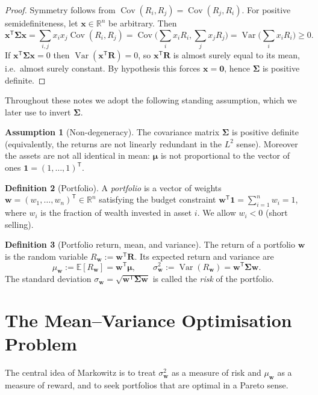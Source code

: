 \documentclass[11pt]{article}
\theoremstyle{definition}
\newtheorem{definition}{Definition}[section]
\newtheorem{assumption}[definition]{Assumption}
\theoremstyle{plain}
\newcommand{\R}{\mathbb{R}}
\newcommand{\E}{\mathbb{E}}
\newcommand{\Var}{\operatorname{Var}}
\newcommand{\Cov}{\operatorname{Cov}}
\newcommand{\one}{\mathbf{1}}
\newcommand{\bw}{\bm{w}}
\newcommand{\bmu}{\bm{\mu}}
\newcommand{\bSigma}{\bm{\Sigma}}
\newcommand{\bzero}{\bm{0}}
\newcommand{\T}{^{\mathsf{T}}}
\begin{document}
\begin{proof}
Symmetry follows from $\Cov(R_i,R_j) = \Cov(R_j,R_i)$. For positive
semidefiniteness, let $\bm{x} \in \R^n$ be arbitrary. Then
\[
\bm{x}\T \bSigma \bm{x}
= \sum_{i,j} x_i x_j \Cov(R_i,R_j)
= \Cov\!\Big(\sum_i x_i R_i, \sum_j x_j R_j\Big)
= \Var\!\Big(\sum_i x_i R_i\Big) \ge 0 .
\]
If $\bm{x}\T \bSigma \bm{x} = 0$ then $\Var(\bm{x}\T \bm{R}) = 0$, so
$\bm{x}\T \bm{R}$ is almost surely equal to its mean, i.e.\ almost surely
constant. By hypothesis this forces $\bm{x} = \bzero$, hence $\bSigma$ is
positive definite.
\end{proof}

Throughout these notes we adopt the following standing assumption, which we
later use to invert $\bSigma$.

\begin{assumption}[Non-degeneracy]\label{ass:nondeg}
The covariance matrix $\bSigma$ is positive definite (equivalently, the
returns are not linearly redundant in the $L^2$ sense). Moreover the assets are
not all identical in mean: $\bmu$ is not proportional to the vector of ones
$\one = (1,\dots,1)\T$.
\end{assumption}

\begin{definition}[Portfolio]
A \emph{portfolio} is a vector of weights $\bw = (w_1,\dots,w_n)\T \in \R^n$
satisfying the budget constraint $\bw\T \one = \sum_{i=1}^n w_i = 1$, where
$w_i$ is the fraction of wealth invested in asset $i$. We allow $w_i < 0$
(short selling).
\end{definition}

\begin{definition}[Portfolio return, mean, and variance]
The return of a portfolio $\bw$ is the random variable $R_{\bw} := \bw\T \bm{R}$.
Its expected return and variance are
\[
\mu_{\bw} := \E[R_{\bw}] = \bw\T \bmu, \qquad
\sigma_{\bw}^2 := \Var(R_{\bw}) = \bw\T \bSigma \bw .
\]
The standard deviation $\sigma_{\bw} = \sqrt{\bw\T \bSigma \bw}$ is called the
\emph{risk} of the portfolio.
\end{definition}

\section{The Mean--Variance Optimisation Problem}

The central idea of Markowitz is to treat $\sigma_{\bw}^2$ as a measure of risk
and $\mu_{\bw}$ as a measure of reward, and to seek portfolios that are optimal
in a Pareto sense.
\end{document}
